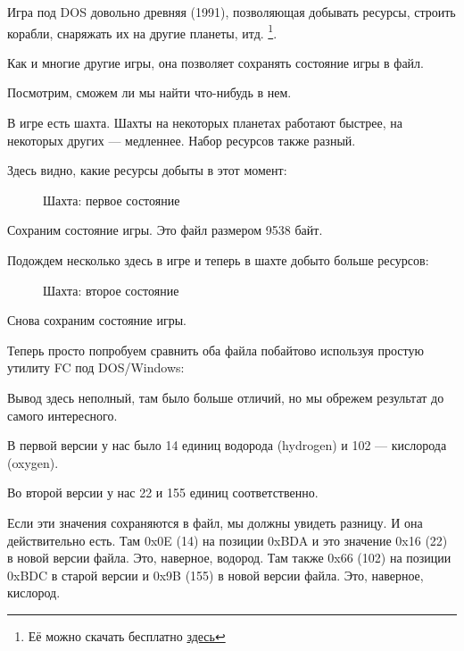 ﻿
\label{Millenium_DOS_game}

Игра  под DOS довольно древняя (1991), позволяющая
добывать ресурсы, строить корабли, снаряжать их на другие планеты, итд.
\footnote{Её можно скачать бесплатно
\href{http://go.yurichev.com/17316}{здесь}}.

Как и многие другие игры, она позволяет сохранять состояние игры в файл.

Посмотрим, сможем ли мы найти что-нибудь в нем.

\clearpage
В игре есть шахта.
Шахты на некоторых планетах работают быстрее, на некоторых других --- медленнее. 
Набор ресурсов также разный.

Здесь видно, какие ресурсы добыты в этот момент: 

\begin{figure}[H]
\centering
{}
\caption{Шахта: первое состояние}
\label{fig:mill_1}
\end{figure}

Сохраним состояние игры.
Это файл размером 9538 байт.

Подождем несколько  здесь в игре и теперь в шахте добыто больше ресурсов:

\begin{figure}[H]
\centering
{}
\caption{Шахта: второе состояние}
\label{fig:mill_2}
\end{figure}

Снова сохраним состояние игры.

Теперь просто попробуем сравнить оба файла побайтово используя простую утилиту FC под DOS/Windows:



Вывод здесь неполный, там было больше отличий, но мы обрежем результат до самого интересного.

В первой версии у нас было 14 единиц водорода (hydrogen) и 102 --- кислорода (oxygen).

Во второй версии у нас 22 и 155 единиц соответственно.

Если эти значения сохраняются в файл, мы должны увидеть разницу.
И она действительно есть. 
Там 0x0E (14) на позиции 0xBDA и это значение 0x16 (22) в новой версии файла.
Это, наверное, водород.
Там также 0x66 (102) на позиции 0xBDC в старой версии и 0x9B (155) в новой версии файла. 
Это, наверное, кислород.

